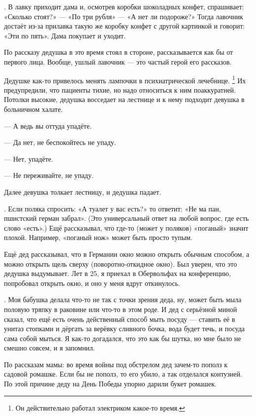 \documentclass{book}
\begin{document}
.
В лавку приходит дама и, осмотрев коробки шоколадных конфет, спрашивает: «Сколько стоят?» --- «По три рубля» --- «А нет ли подороже?»
Тогда лавочник достаёт из-за прилавка такую же коробку конфет с другой картинкой и говорит: «Эти по пять».
Дама покупает и уходит.

По рассказу дедушка в это время стоял в стороне, рассказывается как бы от первого лица.
Вообще, ушлый лавочник --- это частый герой его рассказов.

 Дедушке как-то привелось менять лампочки в психиатрической лечебнице.%
\footnote{Он действительно работал электриком какое-то время.}
Их предупредили, что пациенты тихие, но надо относиться к ним поаккуратней.
Потолки высокие, дедушка восседает на лестнице и к нему подходит девушка в больничном халате.

--- А ведь вы оттуда упадёте.

--- Да нет, не беспокойтесь не упаду.

--- Нет, упадёте.

--- Не переживайте, не упаду.

Далее девушка толкает лестницу, и дедушка падает. 

.
Если поляка спросить: «А туалет у вас есть?»
то ответит: «Не ма пан, пшистский герман забрал».
(Это универсальный ответ на любой вопрос, где есть слово «есть».)
Ещё рассказывал, что где-то (может у поляков) «поганый» значит плохой.
Например, «поганый нож» может быть просто тупым.

Ещё дед рассказывал, что в Германии окно можно открыть обычным способом, а можно открыть щель сверху
(поворотно-откидное окно).
Был уверен, что это дедушка выдумывает.
Лет в 25, я приехал в Обервольфах на конференцию, попробовал открыть окно, и оно у меня вдруг откинулось.

.
Моя бабушка делала что-то не так с точки зрения деда, ну, может быть мыла половую тряпку в раковине или что-то в этом роде.
И дед с серьёзной миной сказал, что ещё есть очень действенный способ мыть посуду --- ставить её в унитаз стопками и дёргать за верёвку сливного бочка, вода будет течь, и посуда сама собой мыться.
Я как-то догадался, что это как бы шутка, но мне было не смешно совсем, и я запомнил.

\medskip

По рассказам мамы: во время войны под обстрелом дед зачем-то пополз к садовой ромашке.
Если бы не пополз, то его убило, а так отделался контузией.
По этой причине деду на День Победы упорно дарили букет ромашек.
\end{document}
